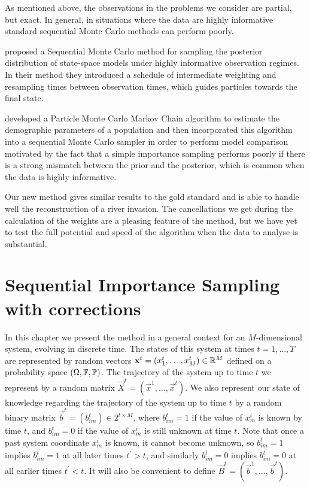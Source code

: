 As mentioned above, the observations in the problems we consider are partial, but exact. In general, in situations where the data are highly informative standard sequential Monte Carlo methods can perform poorly. 

\cite{DelMoral} proposed a Sequential Monte Carlo method for sampling the posterior distribution of state-space models under highly informative observation regimes. In their method they introduced a schedule of intermediate weighting and resampling times between observation times, which guides particles towards the final state.

\cite{Finke} developed a Particle Monte Carlo Markov Chain algorithm to estimate the demographic parameters of a population and then incorporated this algorithm into a sequential Monte Carlo sampler in order to perform model comparison motivated by the fact that a simple importance sampling performs poorly if there is a strong mismatch between the prior and the posterior, which is common when the data is highly informative.

Our new method gives similar results to the gold standard and is able to handle well the reconstruction of a river invasion. The cancellations we get during the calculation of the weights are a pleasing feature of the method, but we have yet to test the full potential and speed of the algorithm when the data to analyse is substantial.

\section{Sequential Importance Sampling with corrections}
\label{sec:2}

In this chapter we present the method in a general context for an $M$-dimensional system, evolving in discrete time. The states of this system at times $t = 1, \dots, T$ are represented by random vectors $\mathbf{x}^t = (x^t_1, \dots, x^t_M) \in \mathbb R^M$ defined on a probability space $(\Omega, \mathbb{F}, \mathbb{P})$. The trajectory of the system up to time $t$ we represent by a random matrix $\vec{X}^t = (\vec{x}^1, \ldots, \vec{x}^t)$. We also represent our state of knowledge regarding the trajectory of the system up to time $t$ by a random binary matrix $\vec{b}^t = (b^t_{im}) \in 2^{t \times M}$, where $b^t_{im} = 1$ if the value of $x^i_m$ is known by time $t$, and $b^t_{im} = 0$ if the value of $x^i_m$ is still unknown at time $t$. Note that once a past system coordinate $x^i_m$ is known, it cannot become unknown, so $b^t_{im} = 1$ implies $b^{t^\prime}_{im} = 1$ at all later times $t^{\prime} > t$, and similarly $b^t_{im} = 0$ implies $b^{t^{\prime}}_{im} = 0$ at all earlier times $t^{\prime} < t$. It will also be convenient to define $\vec{B}^t = (\vec{b}^1,\ldots,\vec{b}^t)$.

